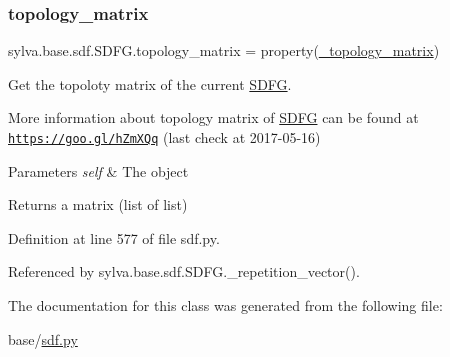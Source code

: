 \subsubsection{\texorpdfstring{topology\+\_\+matrix}{topology\_matrix}}
{\footnotesize\ttfamily sylva.\+base.\+sdf.\+S\+D\+F\+G.\+topology\+\_\+matrix = property(\hyperlink{classsylva_1_1base_1_1sdf_1_1_s_d_f_g_a1bb270c5d255df4a78bd81650fdc80a7}{\+\_\+topology\+\_\+matrix})\hspace{0.3cm}{\ttfamily [static]}}



Get the topoloty matrix of the current \hyperlink{classsylva_1_1base_1_1sdf_1_1_s_d_f_g}{S\+D\+FG}. 

More information about topology matrix of \hyperlink{classsylva_1_1base_1_1sdf_1_1_s_d_f_g}{S\+D\+FG} can be found at \href{https://goo.gl/hZmXQq}{\tt https\+://goo.\+gl/h\+Zm\+X\+Qq} (last check at 2017-\/05-\/16)


\begin{DoxyParams}{Parameters}
{\em self} & The object\\
\hline
\end{DoxyParams}
\begin{DoxyReturn}{Returns}
a matrix (list of list) 
\end{DoxyReturn}


Definition at line 577 of file sdf.\+py.



Referenced by sylva.\+base.\+sdf.\+S\+D\+F\+G.\+\_\+repetition\+\_\+vector().



The documentation for this class was generated from the following file\+:\begin{DoxyCompactItemize}
\item 
base/\hyperlink{sdf_8py}{sdf.\+py}\end{DoxyCompactItemize}
